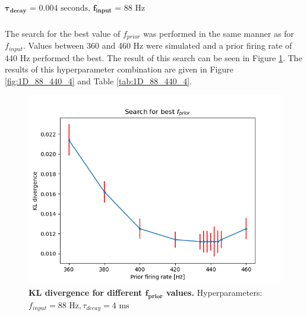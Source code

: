\subparagraph{$\boldsymbol{\tau_{decay}} \text{ = 0.004 seconds, }\mathbf{f_{input}} \text{ = 88 Hz}$}
The search for the best value of $f_{prior}$ was performed in the same manner as for $f_{input}$. Values between 360 and 460 Hz were simulated and a prior firing rate of 440 Hz performed the best. The result of this search can be seen in Figure \ref{fig:1D_KLD_fInput88_tau4}. The results of this hyperparameter combination are given in Figure \ref{fig:1D_88_440_4} and Table \ref{tab:1D_88_440_4}.

\begin{figure}
\centering
  \includegraphics[width=0.75\linewidth]{figures/1D/KLDvsfPrior_fInput88tau4.png}
  \caption{\textbf{KL divergence for different $\mathbf{f_{prior}}$ values.} Hyperparameters: $f_{input} = 88\text{ Hz}, \tau_{decay} = 4\text{ ms}$}
  \label{fig:1D_KLD_fInput88_tau4}
\end{figure}


